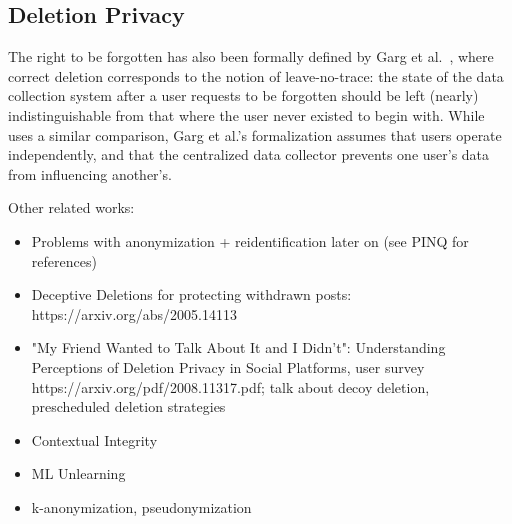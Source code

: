 

\subsection{Deletion Privacy}
The right to be forgotten has also been formally defined by Garg et
al.~\cite{garg}, where correct deletion corresponds to the notion of
leave-no-trace: the state of the data collection system after a user requests to be forgotten should
be left (nearly) indistinguishable from that where the user never existed to begin with. While
\sys{} uses a similar comparison, Garg et al.'s formalization assumes that users operate
independently, and that the centralized data collector prevents one user's data from influencing
another's.

Other related works:
\begin{itemize}
    \item Problems with anonymization + reidentification later on (see PINQ for references)
    \item Deceptive Deletions for protecting withdrawn posts: https://arxiv.org/abs/2005.14113
    \item "My Friend Wanted to Talk About It and I Didn't": Understanding Perceptions of
        Deletion Privacy in Social Platforms, user survey https://arxiv.org/pdf/2008.11317.pdf;
        talk about decoy deletion, prescheduled deletion strategies~\cite{myfw}
    \item Contextual Integrity
    \item ML Unlearning
    \item k-anonymization, pseudonymization
\end{itemize}
